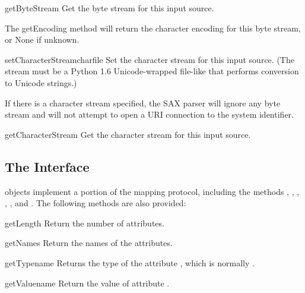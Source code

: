 \begin{methoddesc}[InputSource]{getByteStream}{}
  Get the byte stream for this input source.
        
  The getEncoding method will return the character encoding for this
  byte stream, or None if unknown.
\end{methoddesc}

\begin{methoddesc}[InputSource]{setCharacterStream}{charfile}
  Set the character stream for this input source. (The stream must be
  a Python 1.6 Unicode-wrapped file-like that performs conversion to
  Unicode strings.)
  
  If there is a character stream specified, the SAX parser will ignore
  any byte stream and will not attempt to open a URI connection to the
  system identifier.
\end{methoddesc}

\begin{methoddesc}[InputSource]{getCharacterStream}{}
  Get the character stream for this input source.
\end{methoddesc}


\subsection{The  Interface \label{attributes-objects}}

 objects implement a portion of the mapping
protocol, including the methods , ,
, , , and
.  The following methods are also provided:

\begin{methoddesc}[Attributes]{getLength}{}
  Return the number of attributes.
\end{methoddesc}

\begin{methoddesc}[Attributes]{getNames}{}
  Return the names of the attributes.
\end{methoddesc}

\begin{methoddesc}[Attributes]{getType}{name}
  Returns the type of the attribute , which is normally
  .
\end{methoddesc}

\begin{methoddesc}[Attributes]{getValue}{name}
  Return the value of attribute .
\end{methoddesc}

